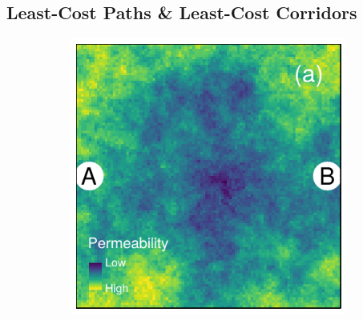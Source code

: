 \documentclass[abstract=on,10pt,a4paper,bibliography=totocnumbered]{scrartcl}
\begin{document}
\subsection{Least-Cost Paths \& Least-Cost Corridors}
\label{Appendix:LeastCost}
\begin{figure}[hbtp]
  \begin{center}
  \begin{minipage}{.25\linewidth}
    \begin{subfigure}[t]{.9\linewidth}
        \includegraphics[width=\textwidth]{99_LeastCostPaths(Example1).pdf}
    \end{subfigure}
  \end{minipage}
  \begin{minipage}{.25\linewidth}
    \begin{subfigure}[t]{.9\linewidth}

\end{subfigure}
\end{minipage}
\end{center}
\end{figure}
\end{document}
